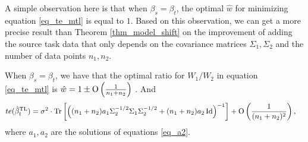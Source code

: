 A simple observation here is that when $\beta_s = \beta_t$, the optimal $\hat{w}$ for minimizing equation \eqref{eq_te_mtl} is equal to $1$.
Based on this observation, we can get a more precise result than Theorem \ref{thm_model_shift} on the improvement of adding the source task data that only depends on the covariance matrices $\Sigma_1, \Sigma_2$ and the number of data points $n_1, n_2$.

\begin{proposition}\label{thm_cov_shift}
	When $\beta_s = \beta_t$, we have that the optimal ratio for $W_1/W_2$ in equation \eqref{eq_te_mtl} is $\hat{w} = 1 \pm \operatorname{O}\left(\frac 1 {n_1+n_2}\right)$ .
	And
	\begin{align*}
		te(\hat{\beta}^{\text{TL}}_{t}) &= \sigma^2 \cdot \operatorname{Tr}\left[\left({(n_1 + n_2)a_1\Sigma_2^{-1/2}\Sigma_1\Sigma_2^{-1/2} + (n_1 + n_2)a_2\operatorname{Id}}\right)^{-1}\right] + \operatorname{O}\left(\frac 1 {(n_1 + n_2)^2}\right),
	\end{align*}
	where $a_1, a_2$ are the solutions of equations \eqref{eq_a2}.
\end{proposition}

